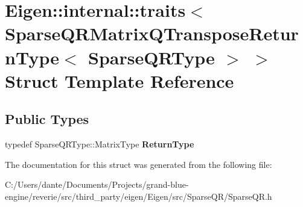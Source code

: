 \hypertarget{struct_eigen_1_1internal_1_1traits_3_01_sparse_q_r_matrix_q_transpose_return_type_3_01_sparse_q_r_type_01_4_01_4}{}\section{Eigen\+::internal\+::traits$<$ Sparse\+Q\+R\+Matrix\+Q\+Transpose\+Return\+Type$<$ Sparse\+Q\+R\+Type $>$ $>$ Struct Template Reference}
\label{struct_eigen_1_1internal_1_1traits_3_01_sparse_q_r_matrix_q_transpose_return_type_3_01_sparse_q_r_type_01_4_01_4}
\subsection*{Public Types}
\begin{DoxyCompactItemize}
\item 
\mbox{\label{struct_eigen_1_1internal_1_1traits_3_01_sparse_q_r_matrix_q_transpose_return_type_3_01_sparse_q_r_type_01_4_01_4_a3d2567bf554756c12327729f4a16ddcc}} 
typedef Sparse\+Q\+R\+Type\+::\+Matrix\+Type {\bfseries Return\+Type}
\end{DoxyCompactItemize}


The documentation for this struct was generated from the following file\+:\begin{DoxyCompactItemize}
\item 
C\+:/\+Users/dante/\+Documents/\+Projects/grand-\/blue-\/engine/reverie/src/third\+\_\+party/eigen/\+Eigen/src/\+Sparse\+Q\+R/Sparse\+Q\+R.\+h\end{DoxyCompactItemize}
